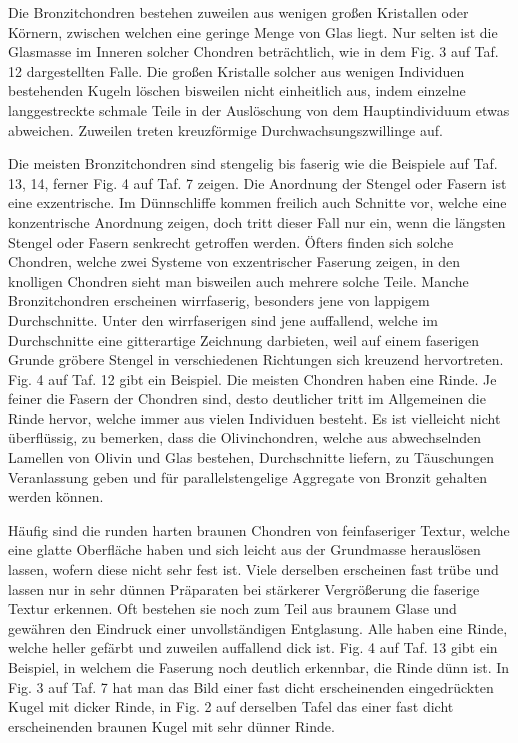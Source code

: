 \documentclass[a4paper, 11pt, oneside, polutonikogreek, german]{article}
\begin{document}
Die Bronzitchondren bestehen zuweilen aus wenigen großen Kristallen oder Körnern, zwischen welchen eine geringe Menge von Glas liegt. Nur selten ist die Glasmasse im Inneren solcher Chondren beträchtlich, wie in dem Fig. 3 auf Taf. 12 dargestellten Falle. Die großen Kristalle solcher aus wenigen Individuen bestehenden Kugeln löschen bisweilen nicht einheitlich aus, indem einzelne langgestreckte schmale Teile in der Auslöschung von dem Hauptindividuum etwas abweichen. Zuweilen treten kreuzförmige Durchwachsungszwillinge auf.

Die meisten Bronzitchondren sind stengelig bis faserig wie die Beispiele auf Taf. 13, 14, ferner Fig. 4 auf Taf. 7 zeigen. Die Anordnung der Stengel oder Fasern ist eine exzentrische. Im Dünnschliffe kommen freilich auch Schnitte vor, welche eine konzentrische Anordnung zeigen, doch tritt dieser Fall nur ein, wenn die längsten Stengel oder Fasern senkrecht getroffen werden. Öfters finden sich solche Chondren, welche zwei Systeme von exzentrischer Faserung zeigen, in den knolligen Chondren sieht man bisweilen auch mehrere solche Teile. Manche Bronzitchondren erscheinen wirrfaserig, besonders jene von lappigem Durchschnitte. Unter den wirrfaserigen sind jene auffallend, welche im Durchschnitte eine gitterartige Zeichnung darbieten, weil auf einem faserigen Grunde gröbere Stengel in verschiedenen Richtungen sich kreuzend hervortreten. Fig. 4 auf Taf. 12 gibt ein Beispiel. Die meisten Chondren haben eine Rinde. Je feiner die Fasern der Chondren sind, desto deutlicher tritt im Allgemeinen die Rinde hervor, welche immer aus vielen Individuen besteht. Es ist vielleicht nicht überflüssig, zu bemerken, dass die Olivinchondren, welche aus abwechselnden Lamellen von Olivin und Glas bestehen, Durchschnitte liefern, zu Täuschungen Veranlassung geben und für parallelstengelige Aggregate von Bronzit gehalten werden können.

Häufig sind die runden harten braunen Chondren von feinfaseriger Textur, welche eine glatte Oberfläche haben und sich leicht aus der Grundmasse herauslösen lassen, wofern diese nicht sehr fest ist. Viele derselben erscheinen fast trübe und lassen nur in sehr dünnen Präparaten bei stärkerer Vergrößerung die faserige Textur erkennen. Oft bestehen sie noch zum Teil aus braunem Glase und gewähren den Eindruck einer unvollständigen Entglasung. Alle haben eine Rinde, welche heller gefärbt und zuweilen auffallend dick ist. Fig. 4 auf Taf. 13 gibt ein Beispiel, in welchem die Faserung noch deutlich erkennbar, die Rinde dünn ist. In Fig. 3 auf Taf. 7 hat man das Bild einer fast dicht erscheinenden eingedrückten Kugel mit dicker Rinde, in Fig. 2 auf derselben Tafel das einer fast dicht erscheinenden braunen Kugel mit sehr dünner Rinde.
\end{document}
